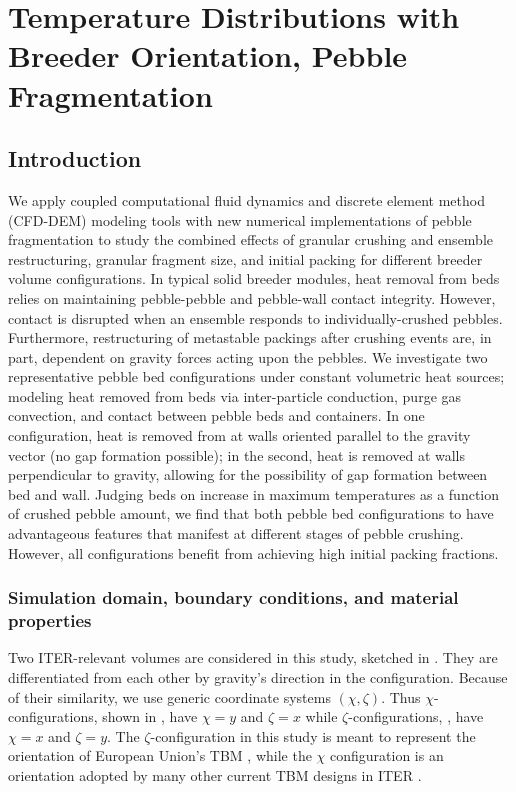 \section{Temperature Distributions with Breeder Orientation, Pebble Fragmentation}\label{sec:isfnt-12}


\subsection{Introduction}

We apply coupled computational fluid dynamics and discrete element method (CFD-DEM) modeling tools with new numerical implementations of pebble fragmentation to study the combined effects of granular crushing and ensemble restructuring, granular fragment size, and initial packing for different breeder volume configurations. In typical solid breeder modules, heat removal from beds relies on maintaining pebble-pebble and pebble-wall contact integrity. However, contact is disrupted when an ensemble responds to individually-crushed pebbles. Furthermore, restructuring of metastable packings after crushing events are, in part, dependent on gravity forces acting upon the pebbles. We investigate two representative pebble bed configurations under constant volumetric heat sources; modeling heat removed from beds via inter-particle conduction, purge gas convection, and contact between pebble beds and containers. In one configuration, heat is removed from at walls oriented parallel to the gravity vector (no gap formation possible); in the second, heat is removed at walls perpendicular to gravity, allowing for the possibility of gap formation between bed and wall. Judging beds on increase in maximum temperatures as a function of crushed pebble amount, we find that both pebble bed configurations to have advantageous features that manifest at different stages of pebble crushing. However, all configurations benefit from achieving high initial packing fractions.



\subsubsection{Simulation domain, boundary conditions, and material properties}

Two ITER-relevant volumes are considered in this study, sketched in . They are differentiated from each other by gravity's direction in the configuration. Because of their similarity, we use generic coordinate systems $(\chi, \zeta)$. Thus $\chi$-configurations, shown in , have $\chi = y$ and $\zeta = x$ while $\zeta$-configurations, , have $\chi = x$ and $\zeta = y$. The $\zeta$-configuration in this study is meant to represent the orientation of European Union's TBM \cite{Hernandez2013}, while the $\chi$ configuration is an orientation adopted by many other current TBM designs in ITER \cite{Cho2008,Feng2012a}.


